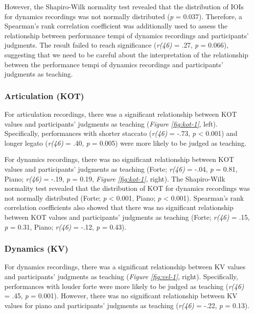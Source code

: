 \documentclass[
  man,floatsintext]{apa6}
\begin{document}
However, the Shapiro-Wilk normality test revealed that the distribution of IOIs for dynamics recordings was not normally distributed (\emph{p} = 0.037). Therefore, a Spearman's rank correlation coefficient was additionally used to assess the relationship between performance tempi of dynamics recordings and participants' judgments. The result failed to reach significance (\emph{r(46)} = .27, \emph{p} = 0.066), suggesting that we need to be careful about the interpretation of the relationship between the performance tempi of dynamics recordings and participants' judgments as teaching.

\hypertarget{articulation-kot}{%
\subsubsection{Articulation (KOT)}\label{articulation-kot}}

For articulation recordings, there was a significant relationship between KOT values and participants' judgments as teaching (\emph{Figure \ref{fig:kot-1}}, left). Specifically, performances with shorter staccato (\emph{r(46)} = -.73, \emph{p} \textless{} 0.001) and longer legato (\emph{r(46)} = .40, \emph{p} = 0.005) were more likely to be judged as teaching.

For dynamics recordings, there was no significant relationship between KOT values and participants' judgments as teaching (Forte; \emph{r(46)} = -.04, \emph{p} = 0.81, Piano; \emph{r(46)} = -.19, \emph{p} = 0.19, \emph{Figure \ref{fig:kot-1}}, right). The Shapiro-Wilk normality test revealed that the distribution of KOT for dynamics recordings was not normally distributed (Forte; \emph{p} \textless{} 0.001, Piano; \emph{p} \textless{} 0.001). Spearman's rank correlation coefficients also showed that there was no significant relationship between KOT values and participants' judgments as teaching (Forte; \emph{r(46)} = .15, \emph{p} = 0.31, Piano; \emph{r(46)} = -.12, \emph{p} = 0.43).

\hypertarget{dynamics-kv}{%
\subsubsection{Dynamics (KV)}\label{dynamics-kv}}

For dynamics recordings, there was a significant relationship between KV values and participants' judgments as teaching (\emph{Figure \ref{fig:vel-1}}, right). Specifically, performances with louder forte were more likely to be judged as teaching (\emph{r(46)} = .45, \emph{p} = 0.001). However, there was no significant relationship between KV values for piano and participants' judgments as teaching (\emph{r(46)} = -.22, \emph{p} = 0.13).
\end{document}
